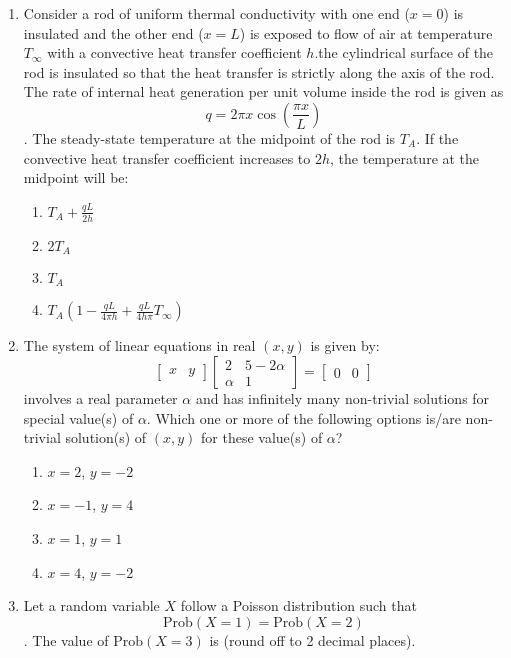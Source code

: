 \documentclass[journal,12pt,onecolumn]{IEEEtran}
\theoremstyle{remark}
\begin{document}
\begin{enumerate}
    \item Consider a rod of uniform thermal conductivity with one end ($x = 0$) is insulated and the other end ($x = L$) is exposed to flow of air at temperature $T_\infty$ with a convective heat transfer coefficient $h$.the cylindrical surface of the rod is insulated so that the heat transfer is strictly along the axis of the rod. The rate of internal heat generation per unit volume inside the rod is given as
    $$q = 2 \pi x \cos \left(\frac{\pi x}{L}\right)$$.
    The steady-state temperature at the midpoint of the rod is $T_A$. If the convective heat transfer coefficient increases to $2h$, the temperature at the midpoint will be:
    \begin{enumerate}
        \item $T_A + \frac{qL}{2h}$
        \item $2T_A$
        \item $T_A$
        \item $T_A \left(1 - \frac{qL}{4\pi h} +  \frac{qL}{4h\pi} T_\infty\right)$
    \end{enumerate}

    \item The system of linear equations in real $(x, y)$ is given by:
\[
    \begin{bmatrix}
        x & y  
    \end{bmatrix}
    \begin{bmatrix} 2 & 5-2\alpha \\ \alpha & 1 \end{bmatrix} = \begin{bmatrix} 0 & 0 \end{bmatrix}
\]
    involves a real parameter $\alpha$ and has infinitely many non-trivial solutions for special value(s) of $\alpha$. Which one or more of the following options is/are non-trivial solution(s) of $(x, y)$ for these value(s) of $\alpha$?
    \begin{enumerate}
        \item $x = 2$, $y = -2$
        \item $x = -1$, $y = 4$
        \item $x = 1$, $y = 1$
        \item $x = 4$, $y = -2$
    \end{enumerate}

    \item Let a random variable $X$ follow a Poisson distribution such that 
    $$\text{Prob}(X = 1) = \text{Prob}(X = 2)$$.
    The value of $\text{Prob}(X = 3)$
    is {\underline{\hspace{2cm}}}(round off to 2 decimal places).


\end{enumerate}
\end{document}
